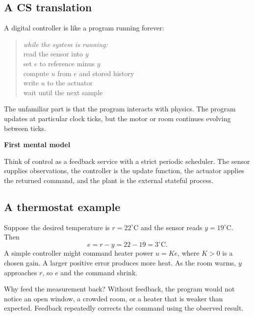 \documentclass[11pt]{article}
\newenvironment{keybox}[1]
  {\begin{center}\begin{lrbox}{\notebox}\begin{minipage}{0.91\linewidth}\small\textbf{#1}\par\smallskip}
  {\end{minipage}\end{lrbox}\fcolorbox{blue!55!black}{blue!4}{\usebox{\notebox}}\end{center}}
\begin{document}
\subsection{A CS translation}

A digital controller is like a program running forever:

\begin{quote}
\small
\emph{while the system is running:}\\
\hspace*{1em}read the sensor into $y$\\
\hspace*{1em}set $e$ to reference minus $y$\\
\hspace*{1em}compute $u$ from $e$ and stored history\\
\hspace*{1em}write $u$ to the actuator\\
\hspace*{1em}wait until the next sample
\end{quote}

The unfamiliar part is that the program interacts with physics. The program updates at particular clock ticks, but the motor or room continues evolving between ticks.

\begin{keybox}{First mental model}
Think of control as a feedback service with a strict periodic scheduler. The sensor supplies observations, the controller is the update function, the actuator applies the returned command, and the plant is the external stateful process.
\end{keybox}

\subsection{A thermostat example}

Suppose the desired temperature is $r=22^\circ$C and the sensor reads $y=19^\circ$C. Then
\[
e=r-y=22-19=3^\circ\text{C}.
\]
A simple controller might command heater power $u=K e$, where $K>0$ is a chosen gain. A larger positive error produces more heat. As the room warms, $y$ approaches $r$, so $e$ and the command shrink.

Why feed the measurement back? Without feedback, the program would not notice an open window, a crowded room, or a heater that is weaker than expected. Feedback repeatedly corrects the command using the observed result.
\end{document}
